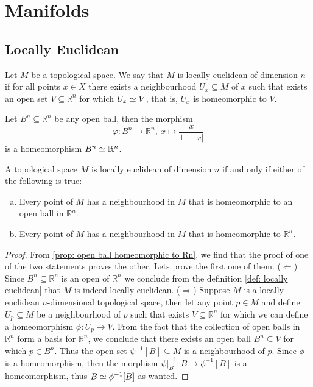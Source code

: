 \section{Manifolds}

\subsection{Locally Euclidean}

\begin{definition}\label{def: locally euclidean}
  Let \(M\) be a topological space. We say that \(M \) is locally euclidean of
  dimension \(n\) if for all points \(x \in X\) there exists a neighbourhood
  \(U_x \subseteq M\) of \(x\) such that exists an open set \(V \subseteq
  \mathbb{R}^n\) for which \(U_x \simeq V\), that is, \(U_x\) is homeomorphic to
  \(V\).
\end{definition}

\begin{proposition}\label{prop: open ball homeomorphic to Rn}
  Let \(B^n \subseteq \mathbb{R}^n\) be any open ball, then the morphism
  \[
    \varphi: B^n \to \mathbb{R}^n,\ x \longmapsto \frac{x}{1 - |x|}
  \] 
  is a homeomorphism \(B^n \simeq \mathbb{R}^n\).
\end{proposition}

\begin{lemma}
  A topological space \(M\) is locally euclidean of dimension \(n\) if and only
  if either of the following is true:
  \begin{enumerate}[(a)]
    \item Every point of \(M\) has a neighbourhood in \(M\) that is homeomorphic
      to an open ball in \(\mathbb{R}^n\).
    \item Every point of \(M\) has a neighbourhood in \(M\) that is homeomorphic
      to \(\mathbb{R}^n\).
  \end{enumerate}
\end{lemma}

\begin{proof}
  From \cref{prop: open ball homeomorphic to Rn}, we find that the proof of one
  of the two statements proves the other. Lets prove the first one of them.
  (\(\Leftarrow\)) Since \(B^n \subseteq \mathbb{R}^n\) is an open of
  \(\mathbb{R}^n\) we conclude from the definition \cref{def: locally euclidean}
  that \(M\) is indeed locally euclidean.
  (\(\Rightarrow\)) Suppose \(M\) is a locally euclidean \(n\)-dimensional
  topological space, then let any point \(p \in M\) and define \(U_p \subseteq
  M\) be a neighbourhood of \(p\) such that exists \(V \subseteq \mathbb{R}^n\)
  for which we can define a homeomorphism \(\phi : U_p \to V\). From the fact
  that the collection of open balls in \(\mathbb{R}^n\) form a basis for
  \(\mathbb{R}^n\), we conclude that there exists an open ball \(B^n \subseteq
  V\) for which \(p \in B^n\). Thus the open set \(\psi^{-1}[B] \subseteq M\) is
  a neighbourhood of \(p\). Since \(\phi\) is a homeomorphism, then the
  morphism \(\psi|_B^{-1} : B \to \phi^{-1}[B]\) is a homeomorphism, thus \(B
  \simeq \phi^{-1}[B]\) as wanted.
\end{proof}

